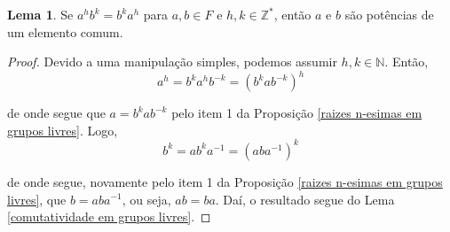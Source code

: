 \documentclass[a4paper,portuguese,11pt,twoside, leqno]{book}
\theoremstyle{definition}
\newtheorem{lemma}[theorem]{Lema}
\begin{document}
	\begin{lemma}
		\label{comutatividade fortalecida em grupos livres}
		Se $a^hb^k = b^ka^h$ para $a,b\in F$ e $h,k\in\mathbb{Z}^\ast$, então $a$ e $b$ são potências de um elemento comum.
	\end{lemma}
	\begin{proof}
		Devido a uma manipulação simples, podemos assumir $h,k\in\mathbb{N}$. Então, 
		\begin{equation*}
		a^h = b^ka^hb^{-k} = (b^kab^{-k})^h
		\end{equation*}
		\par\vspace{0.3cm} de onde segue que $a = b^kab^{-k}$ pelo item 1 da Proposição \eqref{raizes n-esimas em grupos livres}. Logo,
		\begin{equation*}
		b^k = ab^ka^{-1} = (aba^{-1})^k
		\end{equation*}
		\par\vspace{0.3cm} de onde segue, novamente pelo item 1 da Proposição \eqref{raizes n-esimas em grupos livres}, que $b = aba^{-1}$, ou seja, $ab = ba$. Daí, o resultado segue do Lema \eqref{comutatividade em grupos livres}.
	\end{proof}
	
\end{document}
